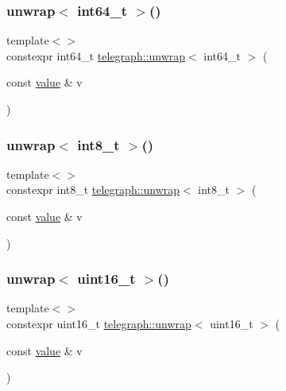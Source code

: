 \mbox{\label{namespacetelegraph_abd6af2f3c5810ce849af3b37bbf8287a}} 
\subsubsection{\texorpdfstring{unwrap$<$ int64\+\_\+t $>$()}{unwrap< int64\_t >()}}
{\footnotesize\ttfamily template$<$$>$ \\
constexpr int64\+\_\+t \hyperlink{namespacetelegraph_ae06614be6a21deb7e0112a24d559f72c}{telegraph\+::unwrap}$<$ int64\+\_\+t $>$ (\begin{DoxyParamCaption}\item[{const \hyperlink{classtelegraph_1_1value}{value} \&}]{v }\end{DoxyParamCaption})}

\mbox{\label{namespacetelegraph_a2118536f845ce42328f8e831d001d1c3}} 
\subsubsection{\texorpdfstring{unwrap$<$ int8\+\_\+t $>$()}{unwrap< int8\_t >()}}
{\footnotesize\ttfamily template$<$$>$ \\
constexpr int8\+\_\+t \hyperlink{namespacetelegraph_ae06614be6a21deb7e0112a24d559f72c}{telegraph\+::unwrap}$<$ int8\+\_\+t $>$ (\begin{DoxyParamCaption}\item[{const \hyperlink{classtelegraph_1_1value}{value} \&}]{v }\end{DoxyParamCaption})}

\mbox{\label{namespacetelegraph_a77747fdae77bfc0a6f28feac16124207}} 
\subsubsection{\texorpdfstring{unwrap$<$ uint16\+\_\+t $>$()}{unwrap< uint16\_t >()}}
{\footnotesize\ttfamily template$<$$>$ \\
constexpr uint16\+\_\+t \hyperlink{namespacetelegraph_ae06614be6a21deb7e0112a24d559f72c}{telegraph\+::unwrap}$<$ uint16\+\_\+t $>$ (\begin{DoxyParamCaption}\item[{const \hyperlink{classtelegraph_1_1value}{value} \&}]{v }\end{DoxyParamCaption})}

